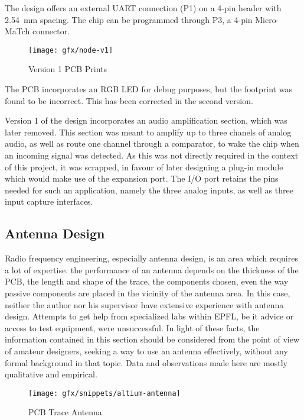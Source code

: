 The design offers an external UART connection (P1) on a 4-pin header with
\SI{2.54}{mm} spacing. The chip can be programmed through P3, a 4-pin
Micro-MaTch\textsuperscript{\texttrademark} connector.

\begin{figure}[htb]
  \begin{center}
    \texttt{[image: gfx/node-v1]}
  \end{center}
  \caption{Version 1 PCB Prints}
  \label{fig:v1-prints}
\end{figure}

The PCB incorporates an RGB LED for debug purposes, but the footprint was found
to be incorrect. This has been corrected in the second version.

Version 1 of the design incorporates an audio amplification section, which was
later removed. This section was meant to amplify up to three chanels of analog
audio, as well as route one channel through a comparator, to wake the chip when
an incoming signal was detected. As this was not directly required in the
context of this project, it was scrapped, in favour of later designing a plug-in
module which would make use of the expansion port. The I/O port retains the pins
needed for such an application, namely the three analog inputs, as well as three
input capture interfaces.


\subsection{Antenna Design}

Radio frequency engineering, especially antenna design, is an area which
requires a lot of expertise. the performance of an antenna depends on the
thickness of the PCB, the length and shape of the trace, the components chosen,
even the way passive components are placed in the vicinity of the antenna area.
In this case, neither the author nor his supervisor have extensive
experience with antenna design. Attempts to get help from specialized labs
within EPFL, be it advice or access to test equipment, were unsuccessful. In
light of these facts, the information contained in this section should be
considered from the point of view of amateur designers, seeking a way to use an
antenna effectively, without any formal background in that topic. Data and
observations made here are mostly qualitative and empirical.

\begin{figure}[htb]
  \begin{center}
    \texttt{[image: gfx/snippets/altium-antenna]}
  \end{center}
  \caption{PCB Trace Antenna}
  \label{fig:trace-antenna}
\end{figure}

